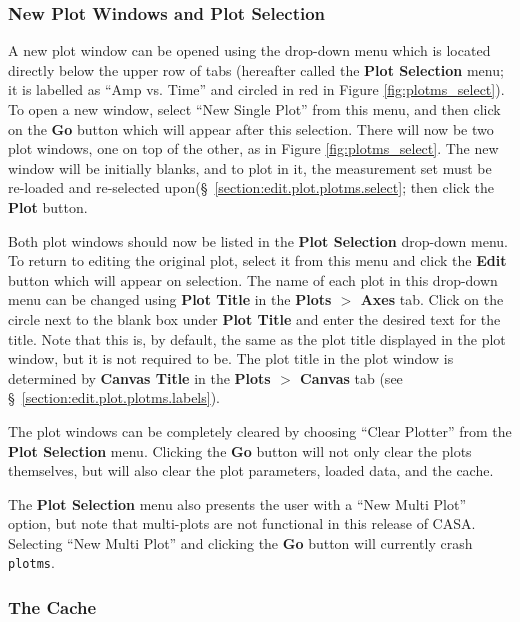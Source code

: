 \subsubsection{New Plot Windows and Plot Selection}
\label{section:edit.plot.plotms.window}

A new plot window can be opened using the drop-down menu which is located directly below the upper row of tabs (hereafter called the {\bf Plot Selection} menu; it is labelled as ``Amp vs. Time'' and circled in red in Figure \ref{fig:plotms_select}). To open a new window, select ``New Single Plot'' from this menu, and then click on the {\bf Go} button which will appear after this selection. There will now be two plot windows, one on top of the other, as in Figure \ref{fig:plotms_select}. The new window will be initially blanks, and to plot in it, the measurement set must be re-loaded and re-selected upon(\S~\ref{section:edit.plot.plotms.select}; then click the {\bf Plot} button. 

Both plot windows should now be listed in the {\bf Plot Selection} drop-down menu. To return to editing the original plot, select it from this menu and click the {\bf Edit} button which will appear on selection. The name of each plot in this drop-down menu can be changed using {\bf Plot Title} in the {\bf Plots $>$ Axes} tab. Click on the circle next to the blank box under {\bf Plot Title} and enter the desired text for the title. Note that this is, by default, the same as the plot title displayed in the plot window, but it is not required to be. The plot title in the plot window is determined by {\bf Canvas Title} in the {\bf Plots $>$ Canvas} tab (see \S~\ref{section:edit.plot.plotms.labels}).

The plot windows can be completely cleared by choosing ``Clear Plotter'' from the {\bf Plot Selection} menu. Clicking the {\bf Go} button will not only clear the plots themselves, but will also clear the plot parameters, loaded data, and the cache. 

The {\bf Plot Selection} menu also presents the user with a ``New Multi Plot'' option, but note that multi-plots are not functional in this release of CASA. Selecting ``New Multi Plot'' and clicking the {\bf Go} button will currently crash {\tt plotms}.


\subsubsection{The Cache}
\label{section:edit.plot.plotms.cache}

